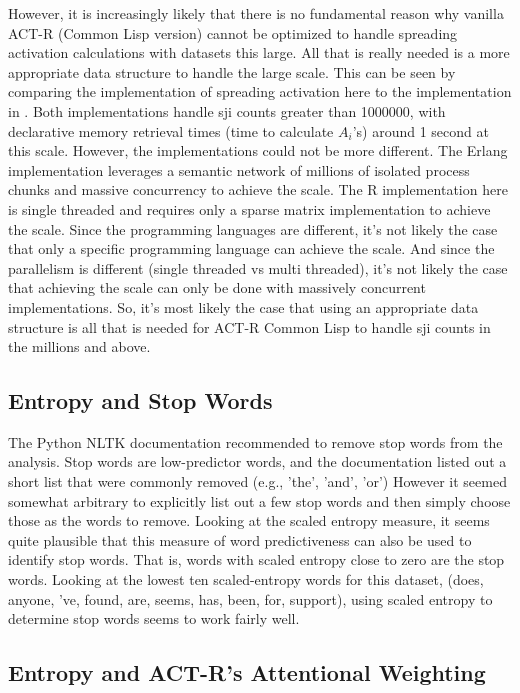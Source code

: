 \documentclass[10pt,letterpaper]{article}
\begin{document}
However, it is increasingly likely that there is no fundamental reason why vanilla ACT-R (Common Lisp version) cannot be optimized to handle spreading activation calculations with datasets this large.
All that is really needed is a more appropriate data structure to handle the large scale.
This can be seen by comparing the implementation of spreading activation here to the implementation in .
Both implementations handle sji counts greater than \num{1000000}, with declarative memory retrieval times (time to calculate $A_i$'s) around 1 second at this scale.
However, the implementations could not be more different.
The Erlang implementation leverages a semantic network of millions of isolated process chunks and massive concurrency to achieve the scale.
The R implementation here is single threaded and requires only a sparse matrix implementation to achieve the scale.
Since the programming languages are different, it's not likely the case that only a specific programming language can achieve the scale.
And since the parallelism is different (single threaded vs multi threaded), it's not likely the case that achieving the scale can only be done with massively concurrent implementations.
So, it's most likely the case that using an appropriate data structure is all that is needed for ACT-R Common Lisp to handle sji counts in the millions and above.

\subsection{Entropy and Stop Words}

The Python NLTK documentation \cite{Bird2009} recommended to remove stop words from the analysis.
Stop words are low-predictor words, and the documentation listed out a short list that were commonly removed (e.g., 'the', 'and', 'or')
However it seemed somewhat arbitrary to explicitly list out a few stop words and then simply choose those as the words to remove.
Looking at the scaled entropy measure, it seems quite plausible that this measure of word predictiveness can also be used to identify stop words.
That is, words with scaled entropy close to zero are the stop words.
Looking at the lowest ten scaled-entropy words for this dataset, (does, anyone, 've, found, are, seems, has, been, for, support), using scaled entropy to determine stop words seems to work fairly well.

\subsection{Entropy and ACT-R's Attentional Weighting}
\end{document}
